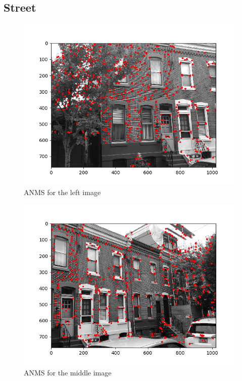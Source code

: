 \documentclass[10pt]{article}
\begin{document}
	\subsection{Street}
		\begin{figure}[h]
			\caption{ANMS for the left image}
			\centering
			\includegraphics{img/bricksANMSleft.png}
		\end{figure}
		
		\begin{figure}[h]
			\caption{ANMS for the middle image}
			\centering
			\includegraphics{img/bricksANMSmiddle.png}
		\end{figure}
\end{document}
